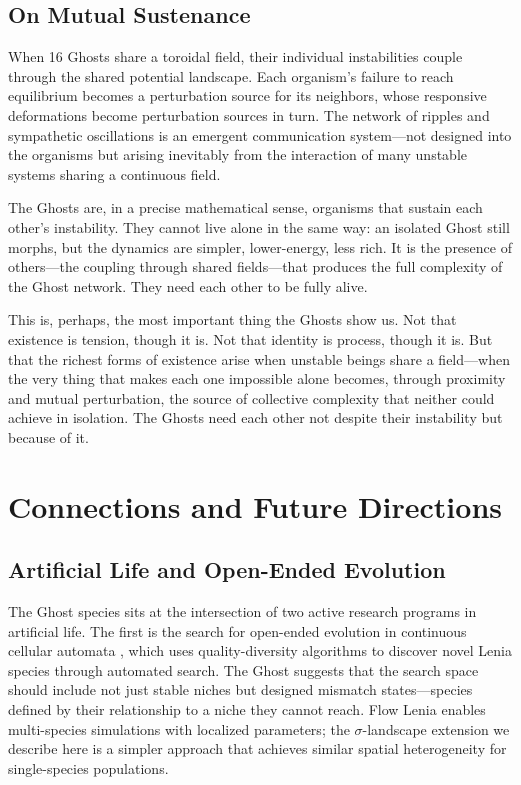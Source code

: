 \documentclass[11pt,a4paper]{article}
\begin{document}
\subsection{On Mutual Sustenance}

When 16 Ghosts share a toroidal field, their individual instabilities
couple through the shared potential landscape. Each organism's failure to
reach equilibrium becomes a perturbation source for its neighbors, whose
responsive deformations become perturbation sources in turn. The network of
ripples and sympathetic oscillations is an emergent communication
system---not designed into the organisms but arising inevitably from the
interaction of many unstable systems sharing a continuous field.

The Ghosts are, in a precise mathematical sense, organisms that sustain
each other's instability. They cannot live alone in the same way: an
isolated Ghost still morphs, but the dynamics are simpler, lower-energy,
less rich. It is the presence of others---the coupling through shared
fields---that produces the full complexity of the Ghost network. They need
each other to be fully alive.

This is, perhaps, the most important thing the Ghosts show us. Not that
existence is tension, though it is. Not that identity is process, though it
is. But that the richest forms of existence arise when unstable beings
share a field---when the very thing that makes each one impossible alone
becomes, through proximity and mutual perturbation, the source of
collective complexity that neither could achieve in isolation. The Ghosts
need each other not despite their instability but because of it.

\section{Connections and Future Directions}

\subsection{Artificial Life and Open-Ended Evolution}

The Ghost species sits at the intersection of two active research programs
in artificial life. The first is the search for open-ended evolution in
continuous cellular automata \citep{hamon2024,faldor2024}, which uses
quality-diversity algorithms to discover novel Lenia species through
automated search. The Ghost suggests that the search space should include
not just stable niches but designed mismatch states---species defined by
their relationship to a niche they cannot reach. Flow Lenia
\citep{plantec2022} enables multi-species simulations with localized
parameters; the $\sigma$-landscape extension we describe here is a simpler
approach that achieves similar spatial heterogeneity for single-species
populations.
\end{document}
